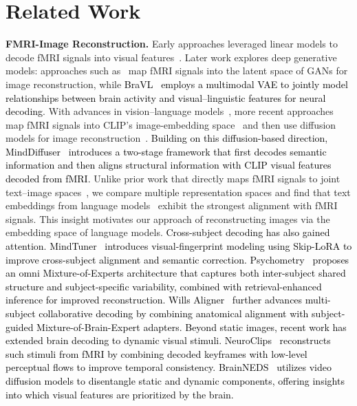 
\section{Related Work}

\textbf{FMRI-Image Reconstruction.} Early approaches leveraged linear models to decode fMRI signals into visual features~\citep{kay2008identifying, takagi2023high}. Later work explores deep generative models: approaches such as~\citep{lin2022mind, ozcelik2022reconstruction, goodfellow2020generative} map fMRI signals into the latent space of GANs for image reconstruction, while \textcolor{black}{BraVL~\citep{du2023decoding} employs a multimodal VAE to jointly model relationships between brain activity and visual–linguistic features for neural decoding}. With advances in vision–language models~\citep{radford2021learning, liang2024survey}, more recent approaches map fMRI signals into CLIP’s image-embedding space~\citep{scotti2024mindeye2, scotti2023reconstructing} and then use diffusion models for image reconstruction~\citep{rombach2022high, xu2023versatile, podell2023sdxl}. \textcolor{black}{Building on this diffusion-based direction, MindDiffuser~\citep{lu2023minddiffuser} introduces a two-stage framework that first decodes semantic information and then aligns structural information with CLIP visual features decoded from fMRI.} Unlike prior work that directly maps fMRI signals to joint text–image spaces~\citep{wang2024decoding, quan2024psychometry}, we compare multiple representation spaces and find that text embeddings from language models~\citep{raffel2020exploring} exhibit the strongest alignment with fMRI signals. This insight motivates our approach of reconstructing images via the embedding space of language models. \textcolor{black}{Cross-subject decoding has also gained attention. MindTuner~\citep{gong2025mindtuner} introduces visual-fingerprint modeling using Skip-LoRA to improve cross-subject alignment and semantic correction.
Psychometry~\citep{quan2024psychometry} proposes an omni Mixture-of-Experts architecture that captures both inter-subject shared structure and subject-specific variability, combined with retrieval-enhanced inference for improved reconstruction.
Wills Aligner~\citep{bao2025wills} further advances multi-subject collaborative decoding by combining anatomical alignment with subject-guided Mixture-of-Brain-Expert adapters. Beyond static images, recent work has extended brain decoding to dynamic visual stimuli.
NeuroClips~\citep{gong2024neuroclips} reconstructs such stimuli from fMRI by combining decoded keyframes with low-level perceptual flows to improve temporal consistency.
BrainNEDS~\citep{yeung2025reanimating} utilizes video diffusion models to disentangle static and dynamic components, offering insights into which visual features are prioritized by the brain.} 



